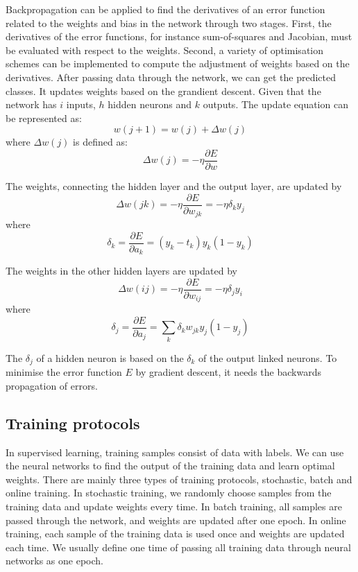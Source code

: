 Backpropagation can be applied to find the derivatives of an error function related to the weights and bias in the network through two stages. First, the derivatives of the error functions, for instance sum-of-squares and Jacobian, must be evaluated with respect to the weights. Second, a variety of optimisation schemes can be implemented to compute the adjustment of weights based on the derivatives. After passing data through the network, we can get the predicted classes. It updates weights based on the grandient descent. Given that the network has $i$ inputs, $h$ hidden neurons and $k$ outputs. The update equation can be represented as:
\begin{equation}\label{eq:UpdateWeights}
w(j+1) = w(j) + \Delta w(j)
\end{equation}
where $\Delta w(j)$ is defined as:
\begin{equation}\label{eq:DeltaWeights}
\Delta w(j) = -\eta \frac{\partial E}{\partial w}
\end{equation}

The weights, connecting the hidden layer and the output layer, are updated by
\begin{equation}\label{eq:h2oBP}
\Delta w(jk) = -\eta \frac{\partial E}{\partial w_{jk}} = -\eta \delta_{k}y_{j}
\end{equation}
where $$\delta_{k} = \frac{\partial E}{\partial a_{k}} = (y_{k} - t_{k})y_{k}(1 - y_{k})$$

The weights in the other hidden layers are updated by
\begin{equation}\label{eq:hiddenBP}
\Delta w(ij) = -\eta \frac{\partial E}{\partial w_{ij}} = -\eta \delta_{j}y_{i}
\end{equation}
where $$\delta_{j} = \frac{\partial E}{\partial a_{j}} = \displaystyle\sum_{k} \delta_{k}w_{jk}y_{j}(1 - y_{j})$$

The $\delta_{j}$ of a hidden neuron is based on the $\delta_{k}$ of the output linked neurons. To minimise the error function $E$ by gradient descent, it needs the backwards propagation of errors.

\subsection{Training protocols}

In supervised learning, training samples consist of data with labels. We can use the neural networks to find the output of the training data and learn optimal weights. There are mainly three types of training protocols, stochastic, batch and online training. In stochastic training, we randomly choose samples from the training data and update weights every time. In batch training, all samples are passed through the network, and weights are updated after one epoch. In online training, each sample of the training data is used once and weights are updated each time. We usually define one time of passing all training data through neural networks as one epoch.

